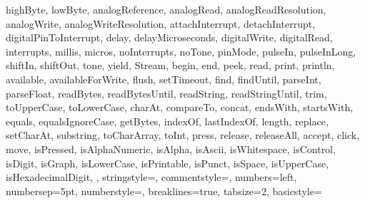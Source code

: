 {{      highByte, lowByte, analogReference, analogRead, 
      analogReadResolution, analogWrite, analogWriteResolution, 
      attachInterrupt, detachInterrupt, digitalPinToInterrupt, delay, 
      delayMicroseconds, digitalWrite, digitalRead, interrupts, millis, 
      micros, noInterrupts, noTone, pinMode, pulseIn, pulseInLong, shiftIn, 
      shiftOut, tone, yield, Stream, begin, end, peek, read, print, 
      println, available, availableForWrite, flush, setTimeout, find, 
      findUntil, parseInt, parseFloat, readBytes, readBytesUntil, readString, 
      readStringUntil, trim, toUpperCase, toLowerCase, charAt, compareTo, 
      concat, endsWith, startsWith, equals, equalsIgnoreCase, getBytes, 
      indexOf, lastIndexOf, length, replace, setCharAt, substring, 
      toCharArray, toInt, press, release, releaseAll, accept, click, move, 
      isPressed, isAlphaNumeric, isAlpha, isAscii, isWhitespace, isControl, 
      isDigit, isGraph, isLowerCase, isPrintable, isPunct, isSpace, 
      isUpperCase, isHexadecimalDigit, 
    },      
  stringstyle=\color{arduinoDarkBlue},    
  commentstyle=\color{arduinoGrey},    
  numbers=left,                    
  numbersep=5pt,                   
  numberstyle=\color{arduinoGrey},    
  breaklines=true,                    %
  tabsize=2,         
  basicstyle=\ttfamily  
}
